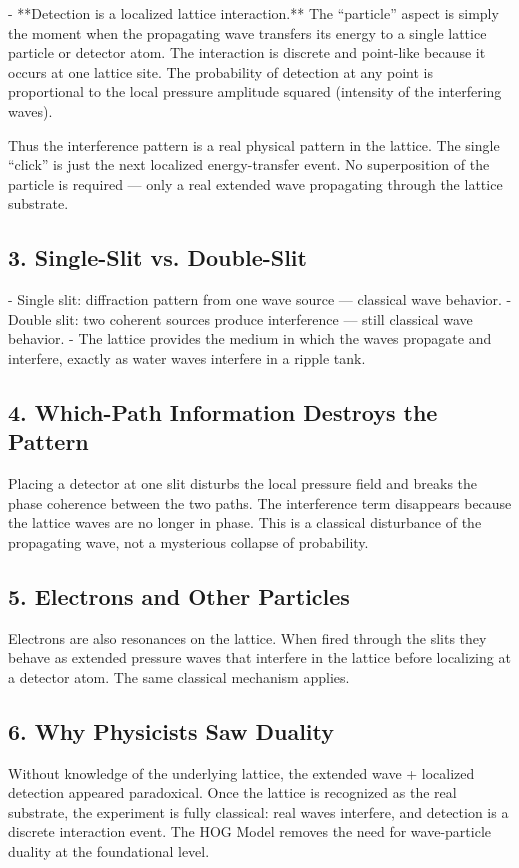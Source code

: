 \documentclass[11pt,a4paper]{book}
\begin{document}
{- **Detection is a localized lattice interaction.** The “particle” aspect is simply the moment when the propagating wave transfers its energy to a single lattice particle or detector atom. The interaction is discrete and point-like because it occurs at one lattice site. The probability of detection at any point is proportional to the local pressure amplitude squared (intensity of the interfering waves).

Thus the interference pattern is a real physical pattern in the lattice. The single “click” is just the next localized energy-transfer event. No superposition of the particle is required — only a real extended wave propagating through the lattice substrate.

\subsection{3. Single-Slit vs. Double-Slit}
- Single slit: diffraction pattern from one wave source — classical wave behavior.
- Double slit: two coherent sources produce interference — still classical wave behavior.
- The lattice provides the medium in which the waves propagate and interfere, exactly as water waves interfere in a ripple tank.

\subsection{4. Which-Path Information Destroys the Pattern}
Placing a detector at one slit disturbs the local pressure field and breaks the phase coherence between the two paths. The interference term disappears because the lattice waves are no longer in phase. This is a classical disturbance of the propagating wave, not a mysterious collapse of probability.

\subsection{5. Electrons and Other Particles}
Electrons are also resonances on the lattice. When fired through the slits they behave as extended pressure waves that interfere in the lattice before localizing at a detector atom. The same classical mechanism applies.

\subsection{6. Why Physicists Saw Duality}
Without knowledge of the underlying lattice, the extended wave + localized detection appeared paradoxical. Once the lattice is recognized as the real substrate, the experiment is fully classical: real waves interfere, and detection is a discrete interaction event. The HOG Model removes the need for wave-particle duality at the foundational level.

}
\end{document}
